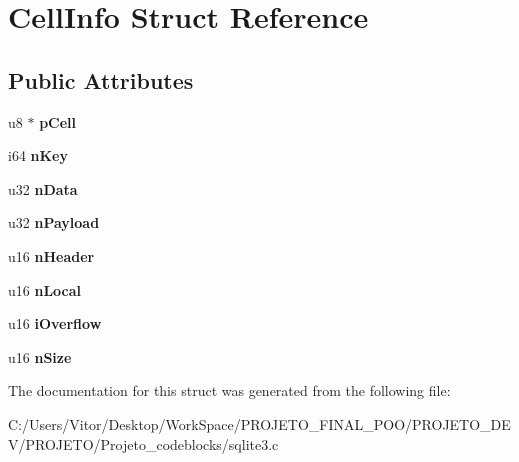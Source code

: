 \hypertarget{struct_cell_info}{\section{Cell\-Info Struct Reference}
\label{struct_cell_info}
}
\subsection*{Public Attributes}
\begin{DoxyCompactItemize}
\item 
\hypertarget{struct_cell_info_a595ed7eeb60ea274d868f24347b7238e}{u8 $\ast$ {\bfseries p\-Cell}}\label{struct_cell_info_a595ed7eeb60ea274d868f24347b7238e}

\item 
\hypertarget{struct_cell_info_a542b041b9a54a13f7c6f2fe63e7542c0}{i64 {\bfseries n\-Key}}\label{struct_cell_info_a542b041b9a54a13f7c6f2fe63e7542c0}

\item 
\hypertarget{struct_cell_info_af2301ed16c35633ec6b5d7792734a4bf}{u32 {\bfseries n\-Data}}\label{struct_cell_info_af2301ed16c35633ec6b5d7792734a4bf}

\item 
\hypertarget{struct_cell_info_ac1e3c1b4216a8e778bbac82907bb1485}{u32 {\bfseries n\-Payload}}\label{struct_cell_info_ac1e3c1b4216a8e778bbac82907bb1485}

\item 
\hypertarget{struct_cell_info_a99bb1f87208f793359cf63e3d164025b}{u16 {\bfseries n\-Header}}\label{struct_cell_info_a99bb1f87208f793359cf63e3d164025b}

\item 
\hypertarget{struct_cell_info_a8cedbcc2c94916fe5798b502c614bb08}{u16 {\bfseries n\-Local}}\label{struct_cell_info_a8cedbcc2c94916fe5798b502c614bb08}

\item 
\hypertarget{struct_cell_info_af7be0161f1c67600aeba783a68972f70}{u16 {\bfseries i\-Overflow}}\label{struct_cell_info_af7be0161f1c67600aeba783a68972f70}

\item 
\hypertarget{struct_cell_info_ace78ab5eb5337b686e31b895feeb0562}{u16 {\bfseries n\-Size}}\label{struct_cell_info_ace78ab5eb5337b686e31b895feeb0562}

\end{DoxyCompactItemize}


The documentation for this struct was generated from the following file\-:\begin{DoxyCompactItemize}
\item 
C\-:/\-Users/\-Vitor/\-Desktop/\-Work\-Space/\-P\-R\-O\-J\-E\-T\-O\-\_\-\-F\-I\-N\-A\-L\-\_\-\-P\-O\-O/\-P\-R\-O\-J\-E\-T\-O\-\_\-\-D\-E\-V/\-P\-R\-O\-J\-E\-T\-O/\-Projeto\-\_\-codeblocks/sqlite3.\-c\end{DoxyCompactItemize}
